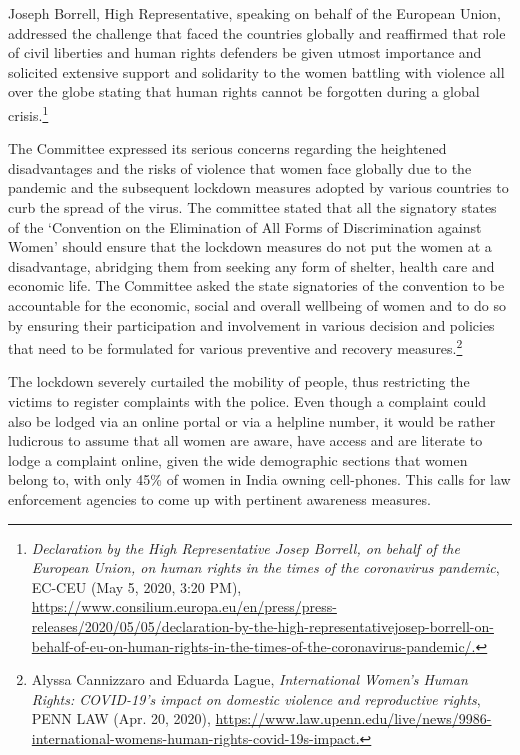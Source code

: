 \begin{multicols}{2}
\noi
Joseph Borrell, High Representative, speaking on behalf of the European Union, addressed
the challenge that faced the countries globally and reaffirmed that role of civil liberties and
human rights defenders be given utmost importance and solicited extensive support and
solidarity to the women battling with violence all over the globe stating that human rights
cannot be forgotten during a global crisis.\footnote{\textit{Declaration by the High Representative Josep Borrell, on behalf of the European Union, on human rights in
the times of the coronavirus pandemic}, EC-CEU (May 5, 2020, 3:20 PM),
\url{https://www.consilium.europa.eu/en/press/press-releases/2020/05/05/declaration-by-the-high-representativejosep-borrell-on-behalf-of-eu-on-human-rights-in-the-times-of-the-coronavirus-pandemic/.}}

\newpage


\noi
The Committee expressed its serious concerns regarding the heightened disadvantages and
the risks of violence that women face globally due to the pandemic and the subsequent
lockdown measures adopted by various countries to curb the spread of the virus. The
committee stated that all the signatory states of the ‘Convention on the Elimination of All
Forms of Discrimination against Women’ should ensure that the lockdown measures do not
put the women at a disadvantage, abridging them from seeking any form of shelter, health
care and economic life. The Committee asked the state signatories of the convention to be
accountable for the economic, social and overall wellbeing of women and to do so by
ensuring their participation and involvement in various decision and policies that need to be
formulated for various preventive and recovery measures.\footnote{Alyssa Cannizzaro and Eduarda Lague, \textit{International Women’s Human Rights: COVID-19’s impact on
domestic violence and reproductive rights}, PENN LAW (Apr. 20, 2020),
\url{https://www.law.upenn.edu/live/news/9986-international-womens-human-rights-covid-19s-impact.}}


\noi
The lockdown severely curtailed the mobility of people, thus restricting the victims to register
complaints with the police. Even though a complaint could also be lodged via an online portal
or via a helpline number, it would be rather ludicrous to assume that all women are aware,
have access and are literate to lodge a complaint online, given the wide demographic sections
that women belong to, with only 45\% of women in India owning cell-phones. This calls for
law enforcement agencies to come up with pertinent awareness measures.



\end{multicols}
